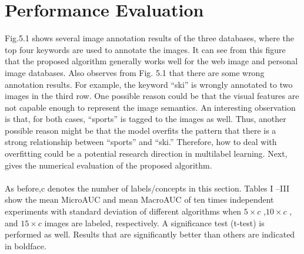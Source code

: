 \documentclass[a4paper,11pt]{report}
\begin{document}
\section{Performance Evaluation}

Fig.5.1 shows several image annotation results of the three
databases, where the top four keywords are used to annotate
the images. It can see from this figure that the proposed algorithm
generally works well for the web image and personal
image databases. Also observes from Fig. 5.1 that there are
some wrong annotation results. For example, the keyword “ski”
is wrongly annotated to two images in the third row. One possible
reason could be that the visual features are not capable
enough to represent the image semantics. An interesting observation
is that, for both cases, “sports” is tagged to the images
as well. Thus, another possible reason might be that the model
overfits the pattern that there is a strong relationship between
“sports” and “ski.” Therefore, how to deal with overfitting could
be a potential research direction in multilabel learning. Next, 
gives the numerical evaluation of the proposed algorithm.
\paragraph{}
As before,c denotes the number of labels/concepts in this
section. Tables I –III show the mean MicroAUC and mean
MacroAUC of ten times independent experiments with standard
deviation of different algorithms when $5\times c$ ,$10\times c$ , and $15\times c$
images are labeled, respectively. A significance test
(t-test) is performed as well. Results that are significantly better
than others are indicated in boldface.
\end{document}
